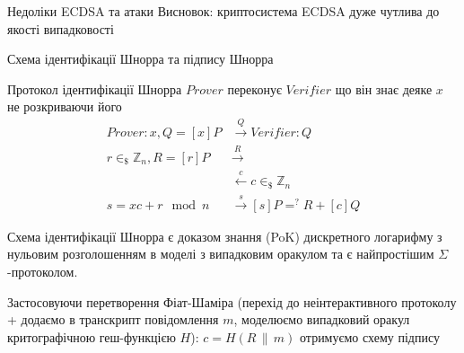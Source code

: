 \documentclass[9pt]{beamer}
\begin{document}
\begin{darkframes}
\begin{frame}{Недоліки ECDSA та атаки}
Висновок: криптосистема ECDSA дуже чутлива до якості випадковості
\end{frame}

\begin{frame}{Схема ідентифікації Шнорра та підпису Шнорра}
\begin{block}{Протокол ідентифікації Шнорра}
     \textbf{} $Prover$ переконує $Verifier$ що він знає деяке $x$ не розкриваючи його
  \begin{align*}
      Prover: x, Q=[x]P & \xrightarrow{Q} Verifier:Q \\
      r \in_\$ \mathbb{Z}_n, R=[r]P & \xrightarrow{R} \\
      & \xleftarrow{c} c\in_\$ \mathbb{Z}_n \\
      s=xc+r \mod n& \xrightarrow{s} [s]P =^? R + [c]Q 
  \end{align*}
\end{block}
 

  Схема ідентифікації Шнорра є доказом знання (PoK) дискретного логарифму з нульовим розголошенням в моделі з випадковим оракулом та є найпростішим $\Sigma$-протоколом.

  Застосовуючи перетворення Фіат-Шаміра (перехід до неінтерактивного протоколу + додаємо в транскрипт повідомлення $m$, моделюємо випадковий оракул критографічною геш-функцією $H$): \(c = H(R \, \|\, m)\) отримуємо схему підпису
  
\end{frame}


\end{darkframes}
\end{document}
